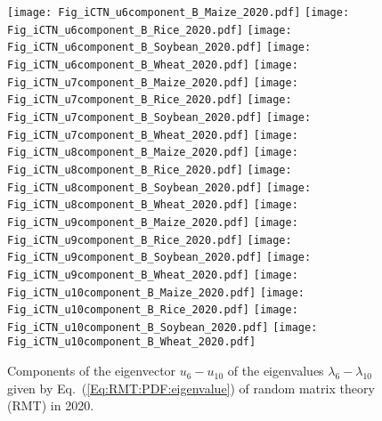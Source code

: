 \documentclass[preprint,3p,times,sort&compress]{elsarticle}
\begin{document}
 \begin{figure}[h!]
      \centering
      \texttt{[image: Fig\_iCTN\_u6component\_B\_Maize\_2020.pdf]}
      \texttt{[image: Fig\_iCTN\_u6component\_B\_Rice\_2020.pdf]}
      \texttt{[image: Fig\_iCTN\_u6component\_B\_Soybean\_2020.pdf]}
      \texttt{[image: Fig\_iCTN\_u6component\_B\_Wheat\_2020.pdf]}
      \texttt{[image: Fig\_iCTN\_u7component\_B\_Maize\_2020.pdf]}
      \texttt{[image: Fig\_iCTN\_u7component\_B\_Rice\_2020.pdf]}
      \texttt{[image: Fig\_iCTN\_u7component\_B\_Soybean\_2020.pdf]}
      \texttt{[image: Fig\_iCTN\_u7component\_B\_Wheat\_2020.pdf]}
      \texttt{[image: Fig\_iCTN\_u8component\_B\_Maize\_2020.pdf]}
      \texttt{[image: Fig\_iCTN\_u8component\_B\_Rice\_2020.pdf]}
      \texttt{[image: Fig\_iCTN\_u8component\_B\_Soybean\_2020.pdf]}
      \texttt{[image: Fig\_iCTN\_u8component\_B\_Wheat\_2020.pdf]}
      \texttt{[image: Fig\_iCTN\_u9component\_B\_Maize\_2020.pdf]}
      \texttt{[image: Fig\_iCTN\_u9component\_B\_Rice\_2020.pdf]}
      \texttt{[image: Fig\_iCTN\_u9component\_B\_Soybean\_2020.pdf]}
      \texttt{[image: Fig\_iCTN\_u9component\_B\_Wheat\_2020.pdf]}
      \texttt{[image: Fig\_iCTN\_u10component\_B\_Maize\_2020.pdf]}
      \texttt{[image: Fig\_iCTN\_u10component\_B\_Rice\_2020.pdf]}
      \texttt{[image: Fig\_iCTN\_u10component\_B\_Soybean\_2020.pdf]}
      \texttt{[image: Fig\_iCTN\_u10component\_B\_Wheat\_2020.pdf]}
      \caption{Components of the eigenvector $u_6-u_{10}$ of the eigenvalues $\lambda_6-\lambda_{10}$ given by Eq.~(\ref{Eq:RMT:PDF:eigenvalue}) of random matrix theory (RMT) in 2020.}
      \label{Fig:iCTN:PDF:eigenvalue:6-10:2020}
\end{figure}
\end{document}

